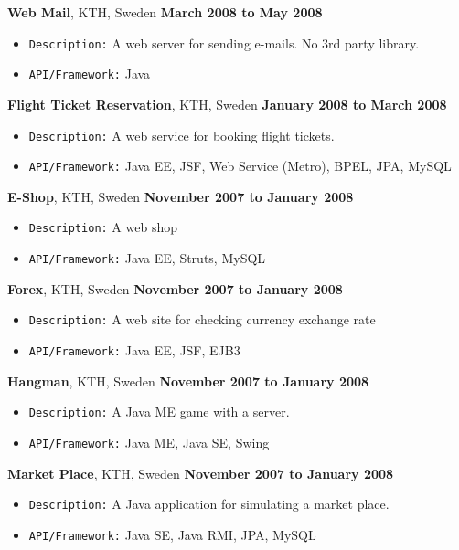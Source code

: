 \documentclass[10pt]{article}
\newenvironment{outerlist}[1][\enskip\textbullet]%
        {\begin{itemize}[#1]}{\end{itemize}%
         \vspace{-.6\baselineskip}}
\newcommand{\blankline}{\quad\pagebreak[2]}
\begin{document}
\blankline

\textbf{Web Mail}, KTH, Sweden \hfill \textbf{March 2008 to May 2008}
\begin{outerlist}
\item \texttt{Description:}
A web server for sending e-mails. No 3rd party library.
\item \texttt{API/Framework:}
Java
\end{outerlist}

\blankline

\textbf{Flight Ticket Reservation}, KTH, Sweden \hfill \textbf{January 2008 to March 2008}
\begin{outerlist}
\item \texttt{Description:}
A web service for booking flight tickets.
\item \texttt{API/Framework:}
Java EE, JSF, Web Service (Metro), BPEL, JPA, MySQL 
\end{outerlist}

\blankline

\textbf{E-Shop}, KTH, Sweden \hfill \textbf{November 2007 to January 2008}
\begin{outerlist}
\item \texttt{Description:}
A web shop
\item \texttt{API/Framework:}
Java EE, Struts, MySQL
\end{outerlist}

\blankline

\textbf{Forex}, KTH, Sweden \hfill \textbf{November 2007 to January 2008}
\begin{outerlist}
\item \texttt{Description:}
A web site for checking currency exchange rate
\item \texttt{API/Framework:}
Java EE, JSF, EJB3
\end{outerlist}

\blankline

\textbf{Hangman}, KTH, Sweden \hfill \textbf{November 2007 to January 2008}
\begin{outerlist}
\item \texttt{Description:}
A Java ME game with a server.
\item \texttt{API/Framework:}
Java ME, Java SE, Swing
\end{outerlist}

\blankline

\textbf{Market Place}, KTH, Sweden \hfill \textbf{November 2007 to January 2008}
\begin{outerlist}
\item \texttt{Description:}
A Java application for simulating a market place.
\item \texttt{API/Framework:}
Java SE, Java RMI, JPA, MySQL
\end{outerlist}
\end{document}
